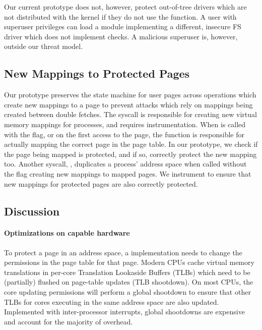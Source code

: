 \documentclass[letterpaper,twocolumn,10pt, anonymous]{article}
\begin{document}
Our current prototype does not, however, protect out-of-tree drivers
which are not distributed with the kernel if they do not use the 
 function.
A user with superuser privileges can load a module implementing a 
different, insecure FS driver which does not implement \tiktok checks.
A malicious superuser is, however, outside our threat model.
%


\subsection{New Mappings to Protected Pages}

Our \tiktok prototype preserves the state machine for user pages
across operations which create new mappings to a page to prevent 
attacks which rely on mappings being created between double fetches.
The  syscall is responsible for creating new virtual
memory mappings for processes, and requires instrumentation.
When  is called with the  flag, or 
on the first access to the page, the  function 
is responsible for actually mapping the correct page in the 
page table. 
In our prototype, we check if the page being mapped is protected, 
and if so, correctly protect the new mapping too.
Another syscall, , duplicates a process' address space
when called without the  flag creating new mappings
to mapped pages. 
We instrument  to ensure that new mappings for protected 
pages are also correctly protected.


\subsection{Discussion}

\paragraph{Optimizations on capable hardware}
To protect a page in an address space, a \tiktok implementation 
needs to change the permissions in the page table for that page.
Modern CPUs cache virtual memory translations in per-core 
Translation Lookaside Buffers (TLBs) which need to be (partially) 
flushed on page-table updates (TLB shootdown).
On most CPUs, the core updating permissions will perform a global 
shootdown to ensure that other TLBs for cores executing in the 
same address space are also updated.
Implemented with inter-processor interrupts, global shootdowns 
are expensive and account for the majority of \tiktok overhead.
\end{document}

